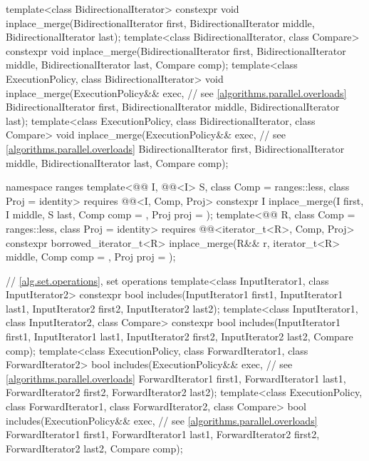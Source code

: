 \begin{codeblock}
{  template<class BidirectionalIterator>
    constexpr void inplace_merge(BidirectionalIterator first,
                                 BidirectionalIterator middle,
                                 BidirectionalIterator last);
  template<class BidirectionalIterator, class Compare>
    constexpr void inplace_merge(BidirectionalIterator first,
                                 BidirectionalIterator middle,
                                 BidirectionalIterator last, Compare comp);
  template<class ExecutionPolicy, class BidirectionalIterator>
    void inplace_merge(ExecutionPolicy&& exec,                  // see \ref{algorithms.parallel.overloads}
                       BidirectionalIterator first,
                       BidirectionalIterator middle,
                       BidirectionalIterator last);
  template<class ExecutionPolicy, class BidirectionalIterator, class Compare>
    void inplace_merge(ExecutionPolicy&& exec,                  // see \ref{algorithms.parallel.overloads}
                       BidirectionalIterator first,
                       BidirectionalIterator middle,
                       BidirectionalIterator last, Compare comp);

  namespace ranges {
    template<@@ I, @@<I> S, class Comp = ranges::less,
             class Proj = identity>
      requires @@<I, Comp, Proj>
      constexpr I inplace_merge(I first, I middle, S last, Comp comp = {}, Proj proj = {});
    template<@@ R, class Comp = ranges::less, class Proj = identity>
      requires @@<iterator_t<R>, Comp, Proj>
      constexpr borrowed_iterator_t<R>
        inplace_merge(R&& r, iterator_t<R> middle, Comp comp = {},
                      Proj proj = {});
  }

  // \ref{alg.set.operations}, set operations
  template<class InputIterator1, class InputIterator2>
    constexpr bool includes(InputIterator1 first1, InputIterator1 last1,
                            InputIterator2 first2, InputIterator2 last2);
  template<class InputIterator1, class InputIterator2, class Compare>
    constexpr bool includes(InputIterator1 first1, InputIterator1 last1,
                            InputIterator2 first2, InputIterator2 last2,
                            Compare comp);
  template<class ExecutionPolicy, class ForwardIterator1, class ForwardIterator2>
    bool includes(ExecutionPolicy&& exec,                       // see \ref{algorithms.parallel.overloads}
                  ForwardIterator1 first1, ForwardIterator1 last1,
                  ForwardIterator2 first2, ForwardIterator2 last2);
  template<class ExecutionPolicy, class ForwardIterator1, class ForwardIterator2,
           class Compare>
    bool includes(ExecutionPolicy&& exec,                       // see \ref{algorithms.parallel.overloads}
                  ForwardIterator1 first1, ForwardIterator1 last1,
                  ForwardIterator2 first2, ForwardIterator2 last2,
                  Compare comp);

}
\end{codeblock}

